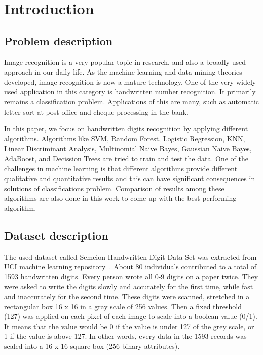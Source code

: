 \documentclass[letterpaper,10pt]{article}
\theoremstyle{mytheor}
\begin{document}
\newpage

\section{Introduction}

\subsection{Problem description}

Image recognition is a very popular topic in research, and also a broadly used approach in our daily life. As the machine learning and data mining theories developed, image recognition is now a mature technology. One of the very widely used application in this category is handwritten number recognition. It primarily remains a classification problem. Applications of this  are many, such as automatic letter sort at post office and cheque processing in the bank.

In this paper, we focus on handwritten digits recognition by applying different algorithms. Algorithms like SVM, Random Forest, Logistic Regression, KNN, Linear Discriminant Analysis, Multinomial Naive Bayes, Gaussian Naive Bayes, AdaBoost, and Decission Trees are tried to train and test the data. One of the challenges in machine learning is that different algorithms provide different qualitative and quantitative results and this can have significant consequences in solutions of classifications problem. Comparison of results among these algorithms are also done in this work to come up with the best performing algorithm.

\subsection{Dataset description}

The used dataset called Semeion Handwritten Digit Data Set was extracted from UCI machine learning repository~\cite{semeion}. About 80 individuals contributed to a total of 1593 handwritten digits. Every person wrote all 0-9 digits on a paper twice. They were asked to write the digits slowly and accurately for the first time, while fast and inaccurately for the second time. These digits were scanned, stretched in a rectangular box 16 x 16 in a gray scale of 256 values. Then a fixed threshold (127) was applied on each pixel of each image to scale into a boolean value (0/1). It means that the value would be 0 if the value is under 127 of the grey scale, or 1 if the value is above 127. In other words, every data in the 1593 records was scaled into a 16 x 16 square box (256 binary attributes).
\end{document}
